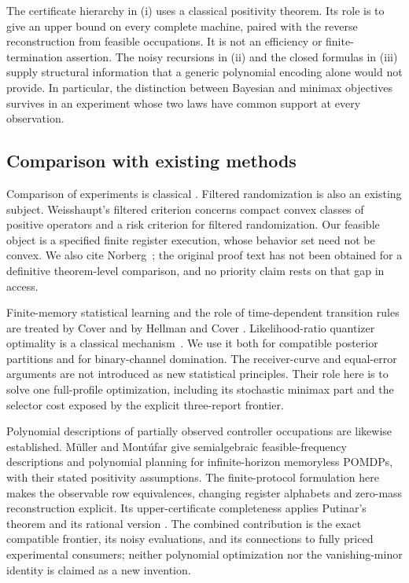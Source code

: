The certificate hierarchy in (i) uses a classical positivity theorem.
Its role is to give an upper bound on every complete machine, paired
with the reverse reconstruction from feasible occupations. It is not
an efficiency or finite-termination assertion. The noisy recursions in
(ii) and the closed formulas in (iii) supply structural information
that a generic polynomial encoding alone would not provide. In
particular, the distinction between Bayesian and minimax objectives
survives in an experiment whose two laws have common support at every
observation.

\subsection{Comparison with existing methods}
Comparison of experiments is classical
\cite{Blackwell1953,LeCam1964,Torgersen1991}. Filtered randomization is
also an existing subject. Weisshaupt's filtered criterion
\cite[Lemma 1 and Theorem 5]{Weisshaupt2002} concerns compact convex
classes of positive operators and a risk criterion for filtered
randomization. Our feasible object is a specified finite register
execution, whose behavior set need not be convex. We also cite
Norberg~\cite{Norberg2002}; the original proof text has not been obtained
for a definitive theorem-level comparison, and no priority claim rests
on that gap in access.

Finite-memory statistical learning and the role of time-dependent
transition rules are treated by Cover and by Hellman and Cover
\cite{Cover1969,HellmanCover1970}. Likelihood-ratio quantizer optimality
is a classical mechanism~\cite[Section III]{Tsitsiklis1993}. We use it
both for compatible posterior partitions and for binary-channel
domination. The receiver-curve and equal-error arguments are not
introduced as new statistical principles. Their role here is to solve
one full-profile optimization, including its stochastic minimax part
and the selector cost exposed by the explicit three-report frontier.

Polynomial descriptions of partially observed controller occupations
are likewise established. M\"uller and Mont\'ufar
\cite[Example 15, Theorem 16 and Remark 19]{MullerMontufar2022} give
semialgebraic feasible-frequency descriptions and polynomial planning
for infinite-horizon memoryless POMDPs, with their stated positivity
assumptions. The finite-protocol formulation here makes the observable
row equivalences, changing register alphabets and zero-mass
reconstruction explicit. Its upper-certificate completeness applies
Putinar's theorem and its rational version
\cite{Putinar1993,Powers2009}. The combined contribution is the exact
compatible frontier, its noisy evaluations, and its connections to
fully priced experimental consumers; neither polynomial optimization
nor the vanishing-minor identity is claimed as a new invention.

